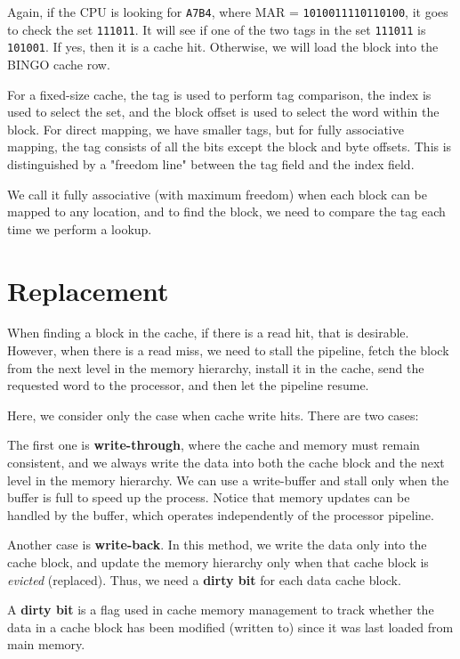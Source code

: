 Again, if the CPU is looking for \verb|A7B4|, where MAR = \verb|1010011110110100|, it goes to check the set \verb|111011|. It will see if one of the two tags in the set \verb|111011| is \verb|101001|. If yes, then it is a cache hit. Otherwise, we will load the block into the BINGO cache row.

For a fixed-size cache, the tag is used to perform tag comparison, the index is used to select the set, and the block offset is used to select the word within the block. For direct mapping, we have smaller tags, but for fully associative mapping, the tag consists of all the bits except the block and byte offsets. This is distinguished by a "freedom line" between the tag field and the index field.

We call it fully associative (with maximum freedom) when each block can be mapped to any location, and to find the block, we need to compare the tag each time we perform a lookup.

\section{Replacement}
When finding a block in the cache, if there is a read hit, that is desirable. However, when there is a read miss, we need to stall the pipeline, fetch the block from the next level in the memory hierarchy, install it in the cache, send the requested word to the processor, and then let the pipeline resume.

Here, we consider only the case when cache write hits. There are two cases:

The first one is \textbf{write-through}, where the cache and memory must remain consistent, and we always write the data into both the cache block and the next level in the memory hierarchy. We can use a write-buffer and stall only when the buffer is full to speed up the process. Notice that memory updates can be handled by the buffer, which operates independently of the processor pipeline.

Another case is \textbf{write-back}. In this method, we write the data only into the cache block, and update the memory hierarchy only when that cache block is \textit{evicted} (replaced). Thus, we need a \textbf{dirty bit} for each data cache block.

\begin{remark}
  A \textbf{dirty bit} is a flag used in cache memory management to track whether the data in a cache block has been modified (written to) since it was last loaded from main memory.
\end{remark}

